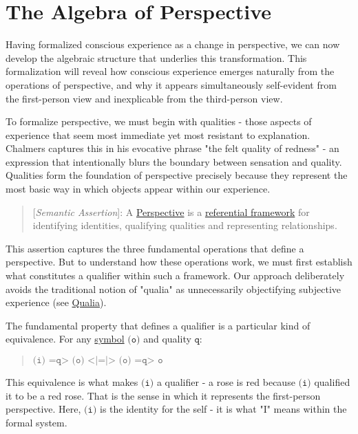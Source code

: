\documentclass[runningheads]{llncs}
\newcommand{\lib}[2]{\href{https://dna-platform.github.io/inexplicable-phenomena#1}{#2}\xspace}
\begin{document}
\section{The Algebra of Perspective}

Having formalized conscious experience as a change in perspective, we can now develop the algebraic structure that underlies this transformation. This formalization will reveal how conscious experience emerges naturally from the operations of perspective, and why it appears simultaneously self-evident from the first-person view and inexplicable from the third-person view.

To formalize perspective, we must begin with qualities - those aspects of experience that seem most immediate yet most resistant to explanation. Chalmers captures this in his evocative phrase "the felt quality of redness" - an expression that intentionally blurs the boundary between sensation and quality. Qualities form the foundation of perspective precisely because they represent the most basic way in which objects appear within our experience.

\begin{quote}
[\emph{Semantic Assertion}]: A \lib{/dictionary/perspective.html}{Perspective} is a \lib{/encyclopedia/semantic-reference-frame.html}{referential framework} for identifying identities, qualifying qualities and representing relationships.
\end{quote}

This assertion captures the three fundamental operations that define a perspective. But to understand how these operations work, we must first establish what constitutes a qualifier within such a framework. Our approach deliberately avoids the traditional notion of "qualia" as unnecessarily objectifying subjective experience (see \lib{/encyclopedia/qualia.html}{Qualia}).

The fundamental property that defines a qualifier is a particular kind of equivalence. For any \lib{/dictionary/symbol.html}{symbol} $\texttt{(o)}$ and quality $\texttt{q}$:

\begin{quote}
$\texttt{(i) =q> (o) <|=|> (o) =q> o}$
\end{quote}

This equivalence is what makes $\texttt{(i)}$ a qualifier - a rose is red because $\texttt{(i)}$ qualified it to be a red rose. That is the sense in which it represents the first-person perspective. Here, $\texttt{(i)}$ is the identity for the self - it is what "I" means within the formal system.
\end{document}

